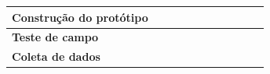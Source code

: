 \begin{table}[]
\begin{tabular}{|l|l|l|l|l|l|l|l|l|l|l|}
\textbf{Construção do protótipo}                            &                                   &                                   &                          &                          &                          &                          &                          & \cellcolor[HTML]{333333} &                          &                          \\ \hline
\textbf{Teste de campo}                                     &                                   &                                   &                          &                          &                          &                          &                          &                          & \cellcolor[HTML]{333333} &                          \\ \hline
\textbf{Coleta de dados}                                    &                                   &                                   &                          &                          &                          &                          &                          &                          & \cellcolor[HTML]{333333} & \cellcolor[HTML]{333333} \\ \hline
\end{tabular}
\end{table}